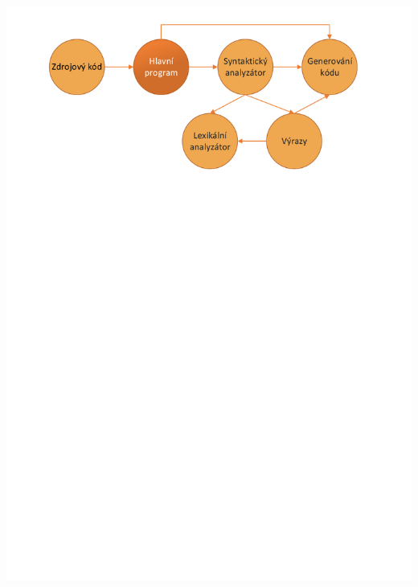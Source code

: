 \documentclass[11pt, hyperref={unicode}]{beamer}
\begin{document}
\begin{frame}
\begin{overprint}
 	\centerline{\includegraphics[width=0.95\linewidth]{img/main.pdf}}%

\end{overprint}
\end{frame}
\end{document}
